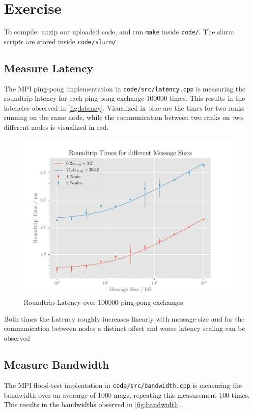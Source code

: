 \documentclass[]{scrartcl}
\newcommand{\exercise}{Exercise \thesection}
\begin{document}
\section*{\exercise}

To compile: unzip our uploaded code, and run \verb|make| inside \verb|code/|.
The slurm scripts are stored inside \verb|code/slurm/|.

\subsection{Measure Latency}
The MPI ping-pong implementation in \verb|code/src/latency.cpp| is measuring the roundtrip latency for each ping pong exchange 100000 times.
This results in the latencies observed in \autoref{fig:latency}.
Visualized in blue are the times for two ranks running on the same node, while the communication between two ranks on two different nodes is visualized in red.

\begin{figure}[ht]
    \centering
    \includegraphics[width=\linewidth]{img/latency}
    \caption{Roundtrip Latency over 100000 ping-pong exchanges}%
    \label{fig:latency}
\end{figure}

Both times the Latency roughly increases linearly with message size and for the communication between nodes a distinct offset and worse latency scaling can be observed

\subsection{Measure Bandwidth}
The MPI flood-test implentation in \verb|code/src/bandwidth.cpp| is measuring the bandwidth over an averarge of 1000 mags, repeating this measurement 100 times.
This results in the bandwidths observed in \autoref{fig:bandwidth}.
\end{document}
